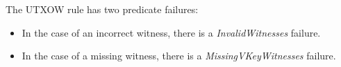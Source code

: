 The UTXOW rule has two predicate failures:
\begin{itemize}                 %
\item In the case of an incorrect witness, there is a \emph{InvalidWitnesses}
  failure.
\item In the case of a missing witness, there is a \emph{MissingVKeyWitnesses}
  failure.
\end{itemize}

\clearpage
